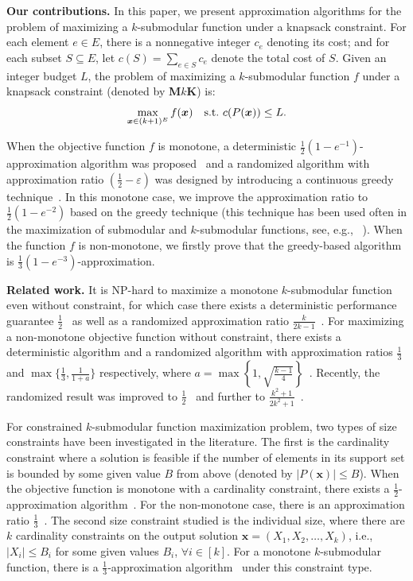 \documentclass[preprint,12pt]{elsarticle}
\def\bx{\boldsymbol{x}}
\def\tM{\textbf{M$k$K}}
\begin{document}
\textbf{Our contributions.}
In this paper, we present approximation algorithms for the problem of maximizing a $k$-submodular function under a knapsack constraint.
For each element $e\in E$, there is a nonnegative integer $c_e$ denoting its cost; and for each subset $S\subseteq E$, let $c(S)=\sum_{e\in S}c_e$ denote the total cost of $S$.
Given an integer budget $L$, the problem of maximizing a $k$-submodular function $f$ under a knapsack constraint (denoted by \tM) is:
\[
\max_{\bx\in(k+1)^E} f(\bx) \quad {\rm s. t.} \ c(P(\bx))\le L.
\]

When the objective function $f$ is monotone, a deterministic  $\frac{1}{2}(1-e^{-1})$-approximation algorithm was proposed~\cite{TWC} and a randomized algorithm with approximation ratio  $(\frac{1}{2}-\varepsilon)$ was designed by introducing a continuous greedy technique~\cite{WZ2017}. In this monotone case,
we improve the approximation ratio to $\frac{1}{2}(1-e^{-2})$ based on the greedy technique (this technique has been used often in the maximization of submodular and $k$-submodular functions, see, e.g., ~\cite{M,TWC}).
When the function $f$ is non-monotone, we firstly prove that the greedy-based algorithm is $\frac{1}{3}(1-e^{-3})$-approximation.

\textbf{Related work.}
It is NP-hard to maximize a monotone $k$-submodular function even without constraint, for which case there exists a deterministic performance guarantee $\frac{1}{2}$~\cite{JS} as well as a randomized approximation ratio $\frac{k}{2k-1}$~\cite{ITY}. For maximizing a non-monotone objective function without constraint, there exists a deterministic algorithm and a randomized algorithm with approximation ratios $\frac{1}{3}$ and $\max\{\frac{1}{3}, \frac{1}{1+a}\}$ respectively, where $a=\max\left\{1, \sqrt{\frac{k-1}{4}}\right\}$~\cite{JS}. Recently, the randomized result was improved to $\frac{1}{2}$~\cite{ITY} and further to $\frac{k^2+1}{2k^2+1}$~\cite{H}.

For constrained $k$-submodular function maximization problem,  two types of size constraints have been investigated in the literature.
The first is the cardinality constraint where a solution is feasible if the number of elements in its support set is bounded by some given value $B$ from above (denoted by $|P(\bx)|\leq B$). When the objective function is monotone with a cardinality constraint, there exists a $\frac{1}{2}$-approximation algorithm~\cite{NY}. For the non-monotone case, there is an approximation ratio $\frac{1}{3}$~\cite{NT}.
The second size constraint studied is the individual size, where there are $k$ cardinality constraints on the output solution $\bx=(X_1,X_2,\ldots,X_k)$, i.e., $|X_i|\leq B_i$ for some given values $B_i$, $\forall i\in [k]$. For a monotone $k$-submodular function, there is a $\frac{1}{3}$-approximation algorithm~\cite{NY} under this constraint type.
\end{document}
